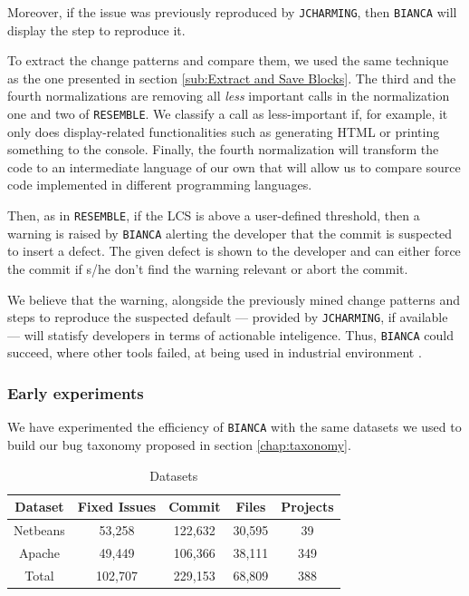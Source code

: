 Moreover, if the issue was previously reproduced by {\tt JCHARMING}, then {\tt BIANCA} will display the step to reproduce it.


To extract the change patterns and compare them, we used the same technique as the one presented in section \ref{sub:Extract and Save Blocks}.
The third and the fourth normalizations are removing all {\it less} important calls in the normalization one and two of {\tt RESEMBLE}.
We classify a call as less-important if, for example, it only does display-related functionalities such as generating HTML or printing something to the console. Finally, the fourth normalization will transform the code to an intermediate language of our own that will allow us to compare source code implemented in different programming languages.

Then, as in {\tt RESEMBLE}, if the LCS is above a user-defined threshold, then a warning is raised by {\tt BIANCA} alerting the developer that the commit is suspected to insert a defect.
The given defect is shown to the developer and can either force the commit if s/he don't find the warning relevant or abort the commit.

We believe that the warning, alongside the previously mined change patterns and steps to reproduce the suspected default --- provided by {\tt JCHARMING}, if available --- will statisfy developers in terms of actionable inteligence.
Thus, {\tt BIANCA} could succeed, where other tools failed, at being used in industrial environment	\cite{Lewis2013}.


\subsubsection{Early experiments}

We have experimented the efficiency of {\tt BIANCA} with the same datasets we used to build our bug taxonomy proposed in section \ref{chap:taxonomy}.

\begin{table}[h]
\begin{center}
\begin{tabular}{@{}c|c|c|c|c@{}}
\textbf{Dataset} & \textbf{Fixed Issues} & \textbf{Commit} & \textbf{Files} & \textbf{Projects} \\ \hline \hline
Netbeans         & 53,258          & 122,632     & 30,595         & 39                \\
Apache           & 49,449          & 106,366     & 38,111         & 349               \\
Total            & 102,707         & 229,153     & 68,809         & 388               \\ \hline \hline

\end{tabular}
\end{center}

\caption{Datasets\label{table:datasets-bianca}}
\end{table}

